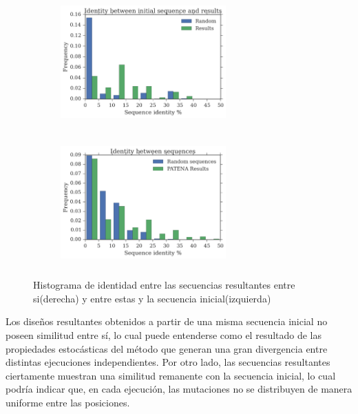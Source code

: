 \begin{figure}[htbp]
  \begin{subfigure}[b]{200px}
  \includegraphics[width=240px,height=185px]{img/resultados/againstInitial-random.png}
    \label{fig:identity-a}
  \end{subfigure}
  \hspace{30px}
  \begin{subfigure}[b]{200px}
    \includegraphics[width=240px,height=185px]{img/resultados/againstAll-random.png}
    \label{fig:identity-b}
  \end{subfigure}
  \caption{Histograma de identidad entre las secuencias resultantes entre si(derecha) y entre estas y la secuencia inicial(izquierda)}
  \label{fig:identity}
\end{figure}



Los diseños resultantes obtenidos a partir de una misma secuencia inicial no poseen similitud entre sí, lo cual puede entenderse como el resultado de las propiedades estocásticas del método que generan 
una gran divergencia entre distintas ejecuciones independientes.
Por otro lado, las secuencias resultantes ciertamente muestran una similitud remanente con la secuencia inicial, lo cual podría indicar que, en cada ejecución, las mutaciones no se distribuyen de manera uniforme entre las posiciones.

